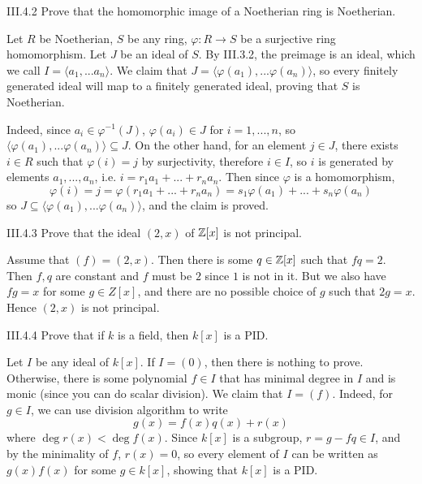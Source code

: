 \begin{problem}{III.4.2}
Prove that the homomorphic image of a Noetherian ring is Noetherian.
\end{problem}
\begin{pf}
Let $R$ be Noetherian, $S$ be any ring, $\varphi:R \to S$ be a surjective ring homomorphism. Let $J$ be an ideal of $S$. By III.3.2, the preimage is an ideal, which we call $I = \langle a_1, ... a_n \rangle$. We claim that $J = \langle \varphi(a_1), ... \varphi(a_n) \rangle$, so every finitely generated ideal will map to a finitely generated ideal, proving that $S$ is Noetherian. 

Indeed, since $a_i \in \varphi^{-1}(J)$, $\varphi(a_i) \in J$ for $i = 1,...,n$, so $\langle \varphi(a_1), ... \varphi(a_n) \rangle \subseteq J$. On the other hand, for an element $j \in J$, there exists $i \in R$ such that $\varphi(i) = j$ by surjectivity, therefore $i \in I$, so $i$ is generated by elements $a_1, ... ,a_n$, i.e. $i = r_1a_1 + ... + r_na_n$. Then since $\varphi$ is a homomorphism, 
\[
\varphi(i) = j = \varphi(r_1a_1 + ... + r_na_n) = s_1\varphi(a_1) + ... + s_n\varphi(a_n)
\]
so $J \subseteq \langle \varphi(a_1), ... \varphi(a_n) \rangle$, and the claim is proved.
\end{pf}

\begin{problem}{III.4.3}
Prove that the ideal $(2,x)$ of $\mathbb{Z}[x]$ is not principal. 
\end{problem}
\begin{pf}
Assume that $(f) = (2,x)$. Then there is some $q \in \mathbb{Z}[x]$ such that $fq = 2$. Then $f,q$ are constant and $f$ must be $2$ since $1$ is not in it. But we also have $fg = x$ for some $g \in Z[x]$, and there are no possible choice of $g$ such that $2g = x$. Hence $(2,x)$ is not principal.
\end{pf}

\begin{problem}{III.4.4}
Prove that if $k$ is a field, then $k[x]$ is a PID.
\end{problem}
\begin{pf}
Let $I$ be any ideal of $k[x]$. If $I = (0)$, then there is nothing to prove. Otherwise, there is some polynomial $f\in I$ that has minimal degree in $I$ and is monic (since you can do scalar division). We claim that $I = (f)$. Indeed, for $g \in I$, we can use division algorithm to write
\[
g(x) = f(x)q(x) + r(x)  
\]  
where $\deg r(x) < \deg f(x)$. Since $k[x]$ is a subgroup, $r = g - fq \in I$, and by the minimality of $f$, $r(x) = 0$, so every element of $I$ can be written as $g(x)f(x)$ for some $g \in k[x]$, showing that $k[x]$ is a PID.
\end{pf}

